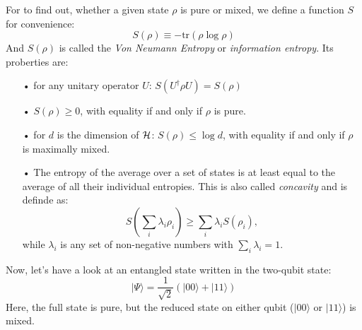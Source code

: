 	 For to find out, whether a given state $\rho$ is pure or mixed, we define a function $S$ for convenience:
		\begin{equation}
			S(\rho)\equiv -\mathrm{tr}(\rho \log \rho)
		\end{equation}	 	
	And $S(\rho)$ is called the \textit{Von Neumann Entropy} or \textit{information entropy}. 
	Its proberties are:
	\begin{itemize}
		\item[•] for any unitary operator $U$: $S(U^\dagger \rho U)=S(\rho)$
		\item[•] $S(\rho)\geq 0$, with equality if and only if $\rho$ is pure. 
		\item[•] for $d$ is the dimension of $\mathcal{H}$: $S(\rho)\leq \log d$, with equality if and only if $\rho$ is maximally mixed.
		\item[•] The entropy of the average over a set of states is at least equal to the average of all their individual entropies. This is also called \textit{concavity} and is definde as:
		\begin{equation}
			S \left(\sum_i \lambda_i \rho_i \right) \geq \sum_i \lambda_i S(\rho_i),
		\end{equation}
	while $\lambda_i$ is any set of non-negative numbers with $\sum_i \lambda_i =1$.
	\end{itemize}
	Now, let's have a look at an entangled state written in the two-qubit state:
		\begin{equation}
			|\Psi\rangle = \frac{1}{\sqrt{2}} \left(|00\rangle + |11\rangle \right)
		\end{equation}
	Here, the full state is pure, but the reduced state on either qubit ($|00\rangle$ or $|11\rangle$) is mixed. 
%	 

\FloatBarrier